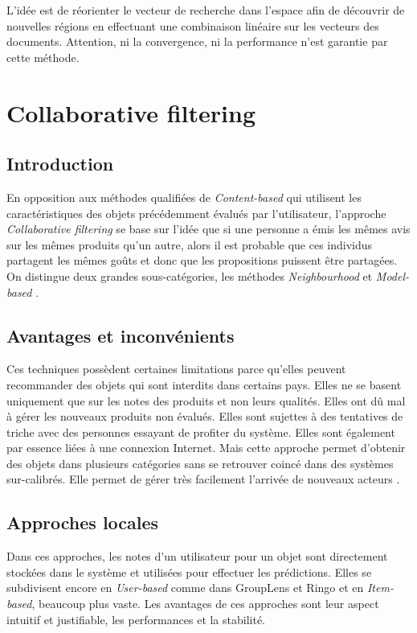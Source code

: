 L'idée est de réorienter le vecteur de recherche dans l'espace afin de découvrir de nouvelles régions en effectuant une combinaison linéaire sur les vecteurs des documents. Attention, ni la convergence, ni la performance n'est garantie par cette méthode.

\section{Collaborative filtering}

\subsection{Introduction}

En opposition aux méthodes qualifiées de \textit{Content-based} qui utilisent les caractéristiques des objets précédemment évalués par l'utilisateur, l'approche \textit{Collaborative filtering} se base sur l'idée que si une personne a émis les mêmes avis sur les mêmes produits qu'un autre, alors il est probable que ces individus partagent les mêmes goûts et donc que les propositions puissent être partagées. On distingue deux grandes sous-catégories, les méthodes \textit{Neighbourhood} et \textit{Model-based} \cite{adomavicius2005toward}.

\subsection{Avantages et inconvénients}

Ces techniques possèdent certaines limitations parce qu'elles peuvent recommander des objets qui sont interdits dans certains pays. Elles ne se basent uniquement que sur les notes des produits et non leurs qualités. Elles ont dû mal à gérer les nouveaux produits non évalués. Elles sont sujettes à des tentatives de triche avec des personnes essayant de profiter du système. Elles sont également par essence liées à une connexion Internet.
Mais cette approche permet d'obtenir des objets dans plusieurs catégories sans se retrouver coincé dans des systèmes sur-calibrés. Elle permet de gérer très facilement l'arrivée de nouveaux acteurs \cite{herlocker2004evaluating}.

\subsection{Approches locales}

Dans ces approches, les notes d'un utilisateur pour un objet sont directement stockées dans le système et utilisées pour effectuer les prédictions. Elles se subdivisent encore en \textit{User-based} comme dans GroupLens \cite{konstan1997grouplens} et Ringo \cite{shardanand1995social} et en \textit{Item-based}, beaucoup plus vaste. Les avantages de ces approches sont leur aspect intuitif et justifiable, les performances et la stabilité.

